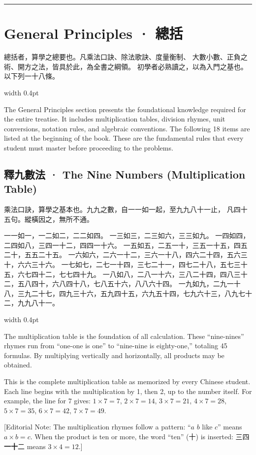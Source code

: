 \documentclass[10pt,a4paper]{article}
\newcommand{\longline}{\noindent\rule{\textwidth}{0.3pt}}
\newlength{\cnwidth}
\newlength{\enwidth}
\newcommand{\bilingual}[2]{%
  \noindent%
  \begin{minipage}[t]{\cnwidth}%
    #1%
  \end{minipage}%
  \hfill\vrule width 0.4pt\hfill%
  \begin{minipage}[t]{\enwidth}%
    #2%
  \end{minipage}%
  \par\smallskip%
}
\newcommand{\bilingualsection}[2]{%
  \section*{#1 · #2}
  \addcontentsline{toc}{section}{#1 · #2}
}
\newcommand{\bilingualsubsection}[2]{%
  \subsection*{#1 · #2}
}
\newcommand{\transnote}[1]{%
  \par\smallskip\noindent\textcolor{notecolor}{\small[Editorial Note: #1]}\par\smallskip
}
\begin{document}
\longline

\bilingualsection{General Principles}{總括}
\label{sec:zongguo}

\bilingual{%
  總括者，算學之總要也。凡乘法口訣、除法歌訣、度量衡制、
  大數小數、正負之術、開方之法，皆具於此，為全書之綱領。
  初學者必熟讀之，以為入門之基也。以下列一十八條。
}{%
  The General Principles section presents the foundational knowledge required for
  the entire treatise. It includes multiplication tables, division rhymes, unit
  conversions, notation rules, and algebraic conventions. The following 18 items
  are listed at the beginning of the book. These are the fundamental rules that
  every student must master before proceeding to the problems.
}

\bilingualsubsection{釋九數法}{The Nine Numbers (Multiplication Table)}

\bilingual{%
  乘法口訣，算學之基本也。九九之數，自一一如一起，至九九八十一止，
  凡四十五句。縱橫因之，無所不通。

  一一如一，一二如二，二二如四。
  一三如三，二三如六，三三如九。
  一四如四，二四如八，三四一十二，四四一十六。
  一五如五，二五一十，三五一十五，四五二十，五五二十五。
  一六如六，二六一十二，三六一十八，四六二十四，五六三十，六六三十六。
  一七如七，二七一十四，三七二十一，四七二十八，五七三十五，六七四十二，七七四十九。
  一八如八，二八一十六，三八二十四，四八三十二，五八四十，六八四十八，七八五十六，八八六十四。
  一九如九，二九一十八，三九二十七，四九三十六，五九四十五，六九五十四，七九六十三，八九七十二，九九八十一。
}{%
  The multiplication table is the foundation of all calculation. These ``nine-nines''
  rhymes run from ``one-one is one'' to ``nine-nine is eighty-one,'' totaling 45 formulas.
  By multiplying vertically and horizontally, all products may be obtained.

  This is the complete multiplication table as memorized by every Chinese student.
  Each line begins with the multiplication by 1, then 2, up to the number itself.
  For example, the line for 7 gives: $1 \times 7 = 7$, $2 \times 7 = 14$, $3 \times 7 = 21$,
  $4 \times 7 = 28$, $5 \times 7 = 35$, $6 \times 7 = 42$, $7 \times 7 = 49$.
}

\transnote{The multiplication rhymes follow a pattern: ``$a$ $b$ like $c$'' means $a \times b = c$.
When the product is ten or more, the word ``ten'' (十) is inserted: 三四\textbf{一十}二 means
$3 \times 4 = 12$.}
\end{document}
